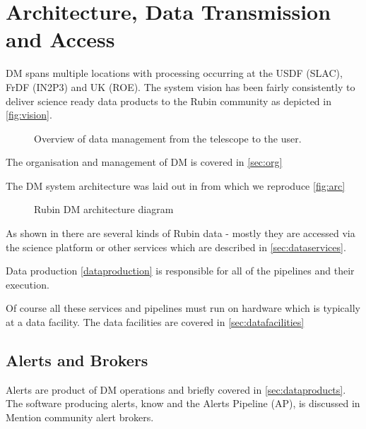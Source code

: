 \section {Architecture, Data Transmission and  Access } \label{sec:arch}
DM spans multiple locations with processing occurring at the USDF (SLAC), FrDF (IN2P3) and UK (ROE).
The system vision has been fairly consistently to deliver science ready data products to the Rubin community as depicted in \autoref{fig:vision}.

\begin{figure}
\caption{Overview of data management from the telescope to the user. \label{fig:vision}}
\end{figure}

The organisation and management of DM is covered in \autoref{sec:org}

The DM system architecture was laid out in \cite{LDM-48} from which we reproduce \autoref{fig:arc}
\begin{figure}
\caption{Rubin DM architecture diagram \citet{LDM-148}\label{fig:arch}}
\end{figure}


As shown in  there are several kinds of Rubin data - mostly they are accessed via
the science platform or other services which are described in \autoref{sec:dataservices}.

Data production \autoref{dataproduction} is responsible for all of the pipelines and their execution.

Of course all these services and pipelines must run on hardware which is typically at a data facility.
The data facilities are covered in \autoref{sec:datafacilities}


\subsection{Alerts and Brokers}
Alerts are  product of DM operations and  briefly covered in \autoref{sec:dataproducts}.
The software producing alerts, know and the Alerts Pipeline (AP), is discussed in 
Mention community alert brokers.
